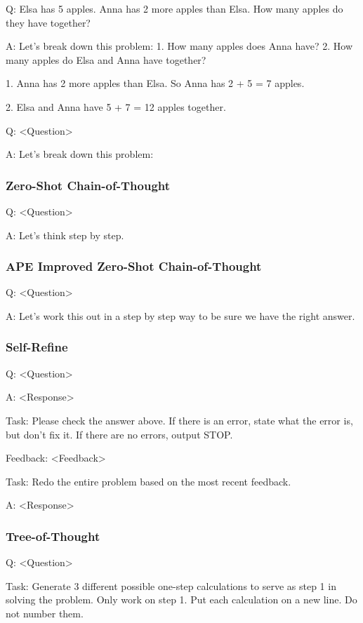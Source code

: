 \documentclass[11pt]{article}
\begin{document}
Q: Elsa has 5 apples. Anna has 2 more apples than Elsa. How many apples do they have together?

A: Let's break down this problem: 1. How many apples does Anna have? 2. How many apples do Elsa and Anna have together?

1. Anna has 2 more apples than Elsa. So Anna has 2 + 5 = 7 apples.

2. Elsa and Anna have 5 + 7 = 12 apples together.

Q: <Question>

A: Let's break down this problem:

\subsubsection*{Zero-Shot Chain-of-Thought}

Q: <Question>

A: Let's think step by step.

\subsubsection*{APE Improved Zero-Shot Chain-of-Thought}

Q: <Question>

A: Let's work this out in a step by step way to be sure we have the right answer.

\subsubsection*{Self-Refine}

Q: <Question>

A: <Response>

Task: Please check the answer above. If there is an error, state what the error is, but don't fix it. If there are no errors, output STOP.

Feedback: <Feedback>

Task: Redo the entire problem based on the most recent feedback.

A: <Response>

\subsubsection*{Tree-of-Thought}

Q: <Question>

Task: Generate 3 different possible one-step calculations to serve as step 1 in solving the problem. Only work on step 1. Put each calculation on a new line. Do not number them.
\end{document}
